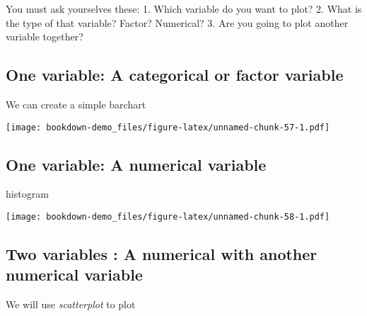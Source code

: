 \documentclass[]{book}
\newenvironment{Shaded}{\begin{snugshade}}{\end{snugshade}}
\newcommand{\KeywordTok}[1]{\textcolor[rgb]{0.13,0.29,0.53}{\textbf{#1}}}
\newcommand{\DataTypeTok}[1]{\textcolor[rgb]{0.13,0.29,0.53}{#1}}
\newcommand{\StringTok}[1]{\textcolor[rgb]{0.31,0.60,0.02}{#1}}
\newcommand{\OperatorTok}[1]{\textcolor[rgb]{0.81,0.36,0.00}{\textbf{#1}}}
\newcommand{\NormalTok}[1]{#1}
\theoremstyle{definition}
\theoremstyle{definition}
\theoremstyle{remark}
\begin{document}
You must ask yourselves these: 1. Which variable do you want to plot? 2.
What is the type of that variable? Factor? Numerical? 3. Are you going
to plot another variable together?

\subsection{One variable: A categorical or factor
variable}\label{one-variable-a-categorical-or-factor-variable}

We can create a simple barchart

\begin{Shaded}
\end{Shaded}

\texttt{[image: bookdown-demo\_files/figure-latex/unnamed-chunk-57-1.pdf]}

\subsection{One variable: A numerical
variable}\label{one-variable-a-numerical-variable}

histogram

\begin{Shaded}
\end{Shaded}

\texttt{[image: bookdown-demo\_files/figure-latex/unnamed-chunk-58-1.pdf]}

\subsection{Two variables : A numerical with another numerical
variable}\label{two-variables-a-numerical-with-another-numerical-variable}

We will use \emph{scatterplot} to plot
\end{document}
